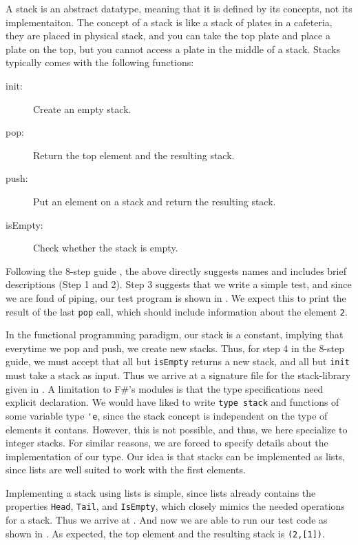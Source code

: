 \documentclass[fsharpNotes.tex]{subfiles}
\begin{document}
A stack is an abstract datatype, meaning that it is defined by its concepts, not its implementaiton. The concept of a stack is like a stack of plates in a cafeteria, they are placed in physical stack, and you can take the top plate and place a plate on the top, but you cannot access a plate in the middle of a stack. Stacks typically comes with the following functions:
\begin{description}
\item[init:] Create an empty stack.
\item[pop:] Return the top element and the resulting stack.
\item[push:] Put an element on a stack and return the resulting stack.
\item[isEmpty:] Check whether the stack is empty.
\end{description}
Following the 8-step guide , the above directly suggests names and includes brief descriptions (Step 1 and 2). Step 3 suggests that we write a simple test, and
since we are fond of piping, our test program is shown in .
We expect this to print the result of the last \lstinline{pop} call, which should include information about the element \lstinline{2}.

In the functional programming paradigm, our stack is a constant, implying that everytime we pop and push, we create new stacks. Thus, for step 4 in the 8-step guide, we must accept that all but \lstinline{isEmpty} returns a new stack, and all but \lstinline{init} must take a stack as input. Thus we arrive at a signature file for the stack-library given in .
A limitation to F\#'s modules is that the type specifications need explicit declaration. We would have liked to write \lstinline{type stack} and functions of some variable type \lstinline{'e}, since the stack concept is independent on the type of elements it contans. However, this is not possible, and thus, we here specialize to integer stacks. For similar reasons, we are forced to specify details about the implementation of our type. Our idea is that stacks can be implemented as lists, since lists are well suited to work with the first elements.

Implementing a stack using lists is simple, since lists already contains the properties \lstinline{Head}, \lstinline{Tail}, and \lstinline{IsEmpty}, which closely mimics the needed operations for a stack. Thus we arrive at .
And now we are able to run our test code as shown in .
As expected, the top element and the resulting stack is \lstinline{(2,[1])}.
\end{document}
